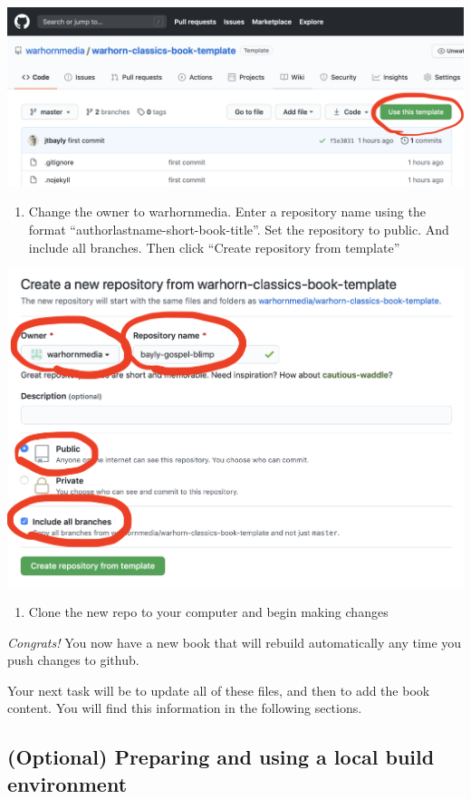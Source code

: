 \documentclass[
  english,
]{book}
\providecommand{\tightlist}{%
  \setlength{\itemsep}{0pt}\setlength{\parskip}{0pt}}
\begin{document}
\begin{center}\includegraphics[width=0.65\linewidth]{images/screenshot1} \end{center}

\begin{enumerate}
\def\labelenumi{\arabic{enumi}.}
\setcounter{enumi}{1}
\tightlist
\item
  Change the owner to warhornmedia. Enter a repository name using the format ``authorlastname-short-book-title''. Set the repository to public. And include all branches. Then click ``Create repository from template''
\end{enumerate}

\begin{center}\includegraphics[width=0.65\linewidth]{images/screenshot2} \end{center}

\begin{enumerate}
\def\labelenumi{\arabic{enumi}.}
\setcounter{enumi}{2}
\tightlist
\item
  Clone the new repo to your computer and begin making changes
\end{enumerate}

\emph{Congrats!} You now have a new book that will rebuild automatically any time you push changes to github.

Your next task will be to update all of these files, and then to add the book content. You will find this information in the following sections.

\hypertarget{optional-preparing-and-using-a-local-build-environment}{%
\subsection{(Optional) Preparing and using a local build environment}\label{optional-preparing-and-using-a-local-build-environment}}
\end{document}
